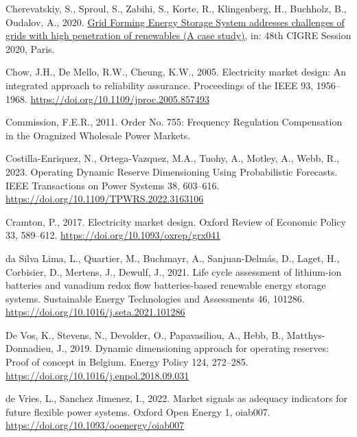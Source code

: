 \documentclass[12pt,a4paper,]{report}
\newlength{\cslhangindent}
\newenvironment{CSLReferences}[2] %
 {%
  \setlength{\parindent}{0pt}
  \ifodd #1 \everypar{\setlength{\hangindent}{\cslhangindent}}\ignorespaces\fi
  \ifnum #2 > 0
  \setlength{\parskip}{#2\baselineskip}
  \fi
 }%
 {}
\begin{document}
\begin{CSLReferences}{1}{0}
\leavevmode{}%
Cherevatskiy, S., Sproul, S., Zabihi, S., Korte, R., Klingenberg, H.,
Buchholz, B., Oudalov, A., 2020.
\href{https://e-cigre.org/publication/SESSION2020_C2-C6-322}{Grid
{Forming Energy Storage System} addresses challenges of grids with high
penetration of renewables ({A} case study)}, in: 48th {CIGRE Session}
2020, {Paris}.

\leavevmode{}%
Chow, J.H., De Mello, R.W., Cheung, K.W., 2005. Electricity market
design: {An} integrated approach to reliability assurance. Proceedings
of the IEEE 93, 1956--1968.
\url{https://doi.org/10.1109/jproc.2005.857493}

\leavevmode{}%
Commission, F.E.R., 2011. Order {No}. 755: {Frequency Regulation
Compensation} in the {Oragnized Wholesale Power Markets}.

\leavevmode{}%
Costilla-Enriquez, N., Ortega-Vazquez, M.A., Tuohy, A., Motley, A.,
Webb, R., 2023. Operating {Dynamic Reserve Dimensioning Using
Probabilistic Forecasts}. IEEE Transactions on Power Systems 38,
603--616. \url{https://doi.org/10.1109/TPWRS.2022.3163106}

\leavevmode{}%
Cramton, P., 2017. Electricity market design. Oxford Review of Economic
Policy 33, 589--612. \url{https://doi.org/10.1093/oxrep/grx041}

\leavevmode{}%
da Silva Lima, L., Quartier, M., Buchmayr, A., Sanjuan-Delmás, D.,
Laget, H., Corbisier, D., Mertens, J., Dewulf, J., 2021. Life cycle
assessment of lithium-ion batteries and vanadium redox flow
batteries-based renewable energy storage systems. Sustainable Energy
Technologies and Assessments 46, 101286.
\url{https://doi.org/10.1016/j.seta.2021.101286}

\leavevmode{}%
De Vos, K., Stevens, N., Devolder, O., Papavasiliou, A., Hebb, B.,
Matthys-Donnadieu, J., 2019. Dynamic dimensioning approach for operating
reserves: {Proof} of concept in {Belgium}. Energy Policy 124, 272--285.
\url{https://doi.org/10.1016/j.enpol.2018.09.031}

\leavevmode{}%
de Vries, L., Sanchez Jimenez, I., 2022. Market signals as adequacy
indicators for future flexible power systems. Oxford Open Energy 1,
oiab007. \url{https://doi.org/10.1093/ooenergy/oiab007}


\end{CSLReferences}
\end{document}
